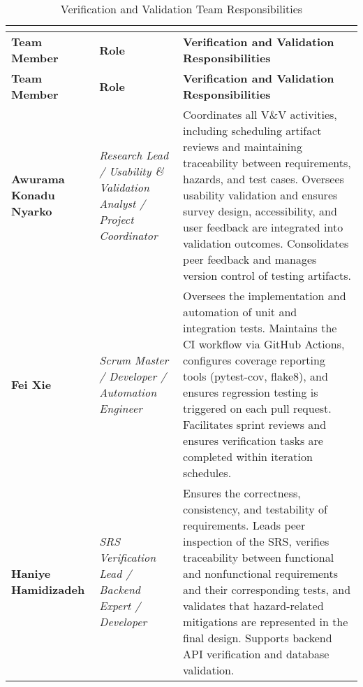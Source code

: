 \documentclass[12pt, titlepage]{article}
\begin{document}
\begin{center}
\footnotesize 
{}
\begin{longtable}{|>{\raggedright\arraybackslash}p{}|
                    >{\raggedright\arraybackslash}p{}|
                    >{\raggedright\arraybackslash}p{}|}
\caption{Verification and Validation Team Responsibilities} \\
\label{tab:vvteamresponsibilities} \\
\hline
\rowcolor{gray!15}
\textbf{Team Member} & \textbf{Role} & \textbf{Verification and Validation Responsibilities} \\
\hline
\endfirsthead

\hline
\rowcolor{gray!15}
\textbf{Team Member} & \textbf{Role} & \textbf{Verification and Validation Responsibilities} \\
\hline
\endhead

\hline
\endfoot
\hline
\endlastfoot

\textbf{Awurama Konadu Nyarko} &
\textit{Research Lead / Usability \& Validation Analyst / Project Coordinator} &
Coordinates all V\&V activities, including scheduling artifact reviews and maintaining traceability between requirements, hazards, and test cases. Oversees usability validation and ensures survey design, accessibility, and user feedback are integrated into validation outcomes. Consolidates peer feedback and manages version control of testing artifacts. \\
\hline

\textbf{Fei Xie} &
\textit{Scrum Master / Developer / Automation Engineer} &
Oversees the implementation and automation of unit and integration tests. Maintains the CI workflow via GitHub Actions, configures coverage reporting tools (pytest-cov, flake8), and ensures regression testing is triggered on each pull request. Facilitates sprint reviews and ensures verification tasks are completed within iteration schedules. \\
\hline

\textbf{Haniye Hamidizadeh} &
\textit{SRS Verification Lead / Backend Expert / Developer} &
Ensures the correctness, consistency, and testability of requirements. Leads peer inspection of the SRS, verifies traceability between functional and nonfunctional requirements and their corresponding tests, and validates that hazard-related mitigations are represented in the final design. Supports backend API verification and database validation. \\
\hline


\end{longtable}
\end{center}
\end{document}
